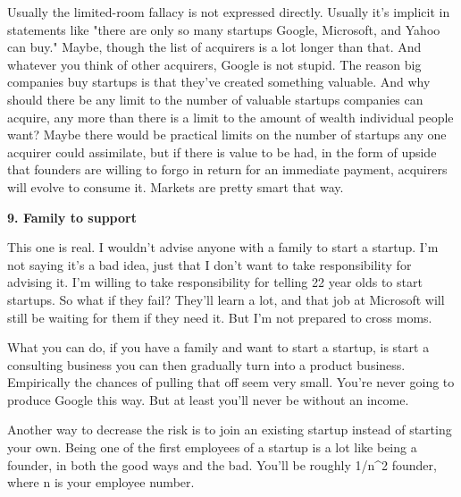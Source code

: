 Usually the
                    limited-room fallacy is not expressed directly. Usually it's
                    implicit in statements like "there are only so many startups
                    Google, Microsoft, and Yahoo can buy." Maybe, though the
                    list of acquirers is a lot longer than that. And whatever
                    you think of other acquirers, Google is not stupid. The
                    reason big companies buy startups is that they've created
                    something valuable. And why should there be any limit to the
                    number of valuable startups companies can acquire, any more
                    than there is a limit to the amount of wealth individual
                    people want? Maybe there would be practical limits on the
                    number of startups any one acquirer could assimilate, but if
                    there is value to be had, in the form of upside that
                    founders are willing to forgo in return for an immediate
                    payment, acquirers will evolve to consume it. Markets are
                    pretty smart that way.

\textbf{9. Family to support}

This one is real. I wouldn't advise anyone with
                    a family to start a startup. I'm not saying it's a bad idea,
                    just that I don't want to take responsibility for advising
                    it. I'm willing to take responsibility for telling 22 year
                    olds to start startups. So what if they fail? They'll learn
                    a lot, and that job at Microsoft will still be waiting for
                    them if they need it. But I'm not prepared to cross moms.

What
                    you can do, if you have a family and want to start a
                    startup, is start a consulting business you can then
                    gradually turn into a product business. Empirically the
                    chances of pulling that off seem very small. You're never
                    going to produce Google this way. But at least you'll never
                    be without an income.

Another way to decrease the
                    risk is to join an existing startup instead of starting your
                    own. Being one of the first employees of a startup is a lot
                    like being a founder, in both the good ways and the bad.
                    You'll be roughly 1/n\textasciicircum{}2 founder, where n is your employee
                    number.

